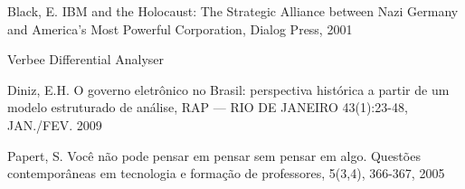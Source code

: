 \documentclass[
12pt,		%
openright,	%
twoside,  %
a4paper,			%
chapter=TITLE,		%
english,			%
french,				%
spanish,			%
brazil				%
]{USPSC-classe/USPSC}
\begin{document}
\begin{flushleft}
\begin{flushleft}
\begin{flushleft}
\begin{flushleft}
[BLACK, 2001] Black, E. IBM and the Holocaust: The Strategic Alliance between Nazi Germany and America's Most Powerful Corporation, Dialog Press, 2001
\end{flushleft}


\end{flushleft}


\end{flushleft}


\end{flushleft}


\begin{flushleft}
\begin{flushleft}
\begin{flushleft}
\begin{flushleft}
[BRITANNICA, 2022] Verbee Differential Analyser
\end{flushleft}


\end{flushleft}


\end{flushleft}


\end{flushleft}


\begin{flushleft}
\begin{flushleft}
\begin{flushleft}
\begin{flushleft}
[DINIZ, 2009] Diniz, E.H. O governo eletr\^onico no Brasil: perspectiva hist\'orica a partir de um modelo estruturado de an\'alise, RAP — RIO DE JANEIRO 43(1):23-48, JAN./FEV. 2009
\end{flushleft}


\end{flushleft}


\end{flushleft}


\end{flushleft}


\begin{flushleft}
\begin{flushleft}
\begin{flushleft}
\begin{flushleft}
[PAPERT, 2005a] Papert, S. Voc\^e n\~ao pode pensar em pensar sem pensar em algo. Quest\~oes contempor\^aneas em tecnologia e forma\c{c}\~ao de professores, 5(3,4), 366-367, 2005
\end{flushleft}


\end{flushleft}


\end{flushleft}


\end{flushleft}
\end{document}
